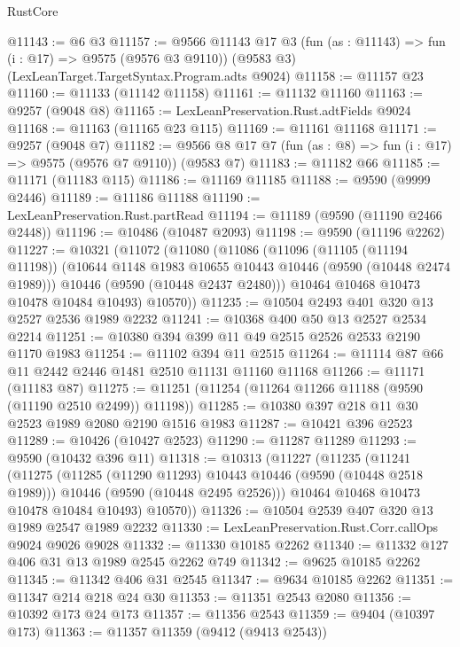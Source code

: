 \begin{lexlean}{RustCore}
\begin{coremodule}
@11143 := @6 @3
@11157 := @9566
    @11143
    @17
    @3
    (fun (as : @11143) => fun (i : @17) => @9575 (@9576 @3 @9110))
    (@9583 @3)
    (LexLeanTarget.TargetSyntax.Program.adts @9024)
@11158 := @11157 @23
@11160 := @11133 (@11142 @11158)
@11161 := @11132 @11160
@11163 := @9257 (@9048 @8)
@11165 := LexLeanPreservation.Rust.adtFields @9024
@11168 := @11163 (@11165 @23 @115)
@11169 := @11161 @11168
@11171 := @9257 (@9048 @7)
@11182 := @9566 @8 @17 @7 (fun (as : @8) => fun (i : @17) => @9575 (@9576 @7 @9110)) (@9583 @7)
@11183 := @11182 @66
@11185 := @11171 (@11183 @115)
@11186 := @11169 @11185
@11188 := @9590 (@9999 @2446)
@11189 := @11186 @11188
@11190 := LexLeanPreservation.Rust.partRead
@11194 := @11189 (@9590 (@11190 @2466 @2448))
@11196 := @10486 (@10487 @2093)
@11198 := @9590 (@11196 @2262)
@11227 := @10321
    (@11072
      (@11080
        (@11086
          (@11096
            (@11105 (@11194 @11198))
            (@10644 @1148 @1983 @10655 @10443 @10446 (@9590 (@10448 @2474 @1989)))
            @10446
            (@9590 (@10448 @2437 @2480)))
          @10464
          @10468
          @10473
          @10478
          @10484
          @10493)
        @10570))
@11235 := @10504 @2493 @401 @320 @13 @2527 @2536 @1989 @2232
@11241 := @10368 @400 @50 @13 @2527 @2534 @2214
@11251 := @10380 @394 @399 @11 @49 @2515 @2526 @2533 @2190 @1170 @1983
@11254 := @11102 @394 @11 @2515
@11264 := @11114 @87 @66 @11 @2442 @2446 @1481 @2510 @11131 @11160 @11168
@11266 := @11171 (@11183 @87)
@11275 := @11251 (@11254 (@11264 @11266 @11188 (@9590 (@11190 @2510 @2499)) @11198))
@11285 := @10380 @397 @218 @11 @30 @2523 @1989 @2080 @2190 @1516 @1983
@11287 := @10421 @396 @2523
@11289 := @10426 (@10427 @2523)
@11290 := @11287 @11289
@11293 := @9590 (@10432 @396 @11)
@11318 := @10313
    (@11227
      (@11235
        (@11241
          (@11275
            (@11285 (@11290 @11293) @10443 @10446 (@9590 (@10448 @2518 @1989)))
            @10446
            (@9590 (@10448 @2495 @2526)))
          @10464
          @10468
          @10473
          @10478
          @10484
          @10493)
        @10570))
@11326 := @10504 @2539 @407 @320 @13 @1989 @2547 @1989 @2232
@11330 := LexLeanPreservation.Rust.Corr.callOps @9024 @9026 @9028
@11332 := @11330 @10185 @2262
@11340 := @11332 @127 @406 @31 @13 @1989 @2545 @2262 @749
@11342 := @9625 @10185 @2262
@11345 := @11342 @406 @31 @2545
@11347 := @9634 @10185 @2262
@11351 := @11347 @214 @218 @24 @30
@11353 := @11351 @2543 @2080
@11356 := @10392 @173 @24 @173
@11357 := @11356 @2543
@11359 := @9404 (@10397 @173)
@11363 := @11357 @11359 (@9412 (@9413 @2543))

\end{coremodule}
\end{lexlean}
